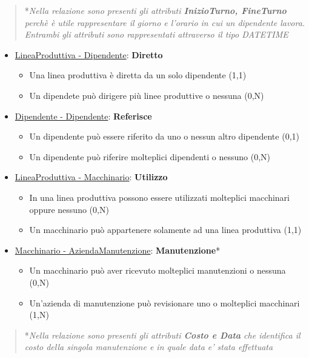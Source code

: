 \begin{verse}
	*\emph{Nella relazione sono presenti gli attributi \textbf{InizioTurno, FineTurno} perchè è utile rappresentare il giorno e l'orario in cui un dipendente lavora. Entrambi gli attributi sono rappresentati attraverso il tipo DATETIME}
\end{verse}

\begin{itemize}
	\item \underline{LineaProduttiva - Dipendente}: \textbf{Diretto}
	
	\begin{itemize}
		\item Una linea produttiva è diretta da un solo dipendente (1,1)
		\item Un dipendete può dirigere più linee produttive o nessuna (0,N)
	\end{itemize}
	
\end{itemize}

\begin{itemize}
	\item \underline{Dipendente - Dipendente}: \textbf{Referisce}
	
	\begin{itemize}
		\item Un dipendente può essere riferito da uno o nessun altro dipendente (0,1)
		\item Un dipendente può riferire molteplici dipendenti o nessuno (0,N)
	\end{itemize}
	
\end{itemize}

\begin{itemize}
	\item \underline{LineaProduttiva - Macchinario}: \textbf{Utilizzo}
	
	\begin{itemize}
		\item In una linea produttiva possono essere utilizzati molteplici macchinari oppure nessuno (0,N)
		\item Un macchinario può appartenere solamente ad una linea produttiva (1,1)
	\end{itemize}
	
\end{itemize}

\begin{itemize}
	\item \underline{Macchinario - AziendaManutenzione}: \textbf{Manutenzione}*
	
	\begin{itemize}
		\item Un macchinario può aver ricevuto molteplici manutenzioni o nessuna (0,N)
		\item Un'azienda di manutenzione può revisionare uno o molteplici macchinari (1,N)
	\end{itemize}
	
\end{itemize}

\begin{verse}
	*\emph{Nella relazione sono presenti gli attributi \textbf{Costo e Data} che identifica il costo della singola manutenzione e in quale data e' stata effettuata}
\end{verse}

